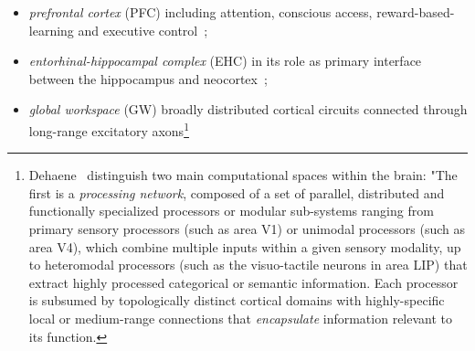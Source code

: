 \begin{itemize}
%
\item {\it{prefrontal cortex}} (PFC) including attention, conscious access, reward-based-learning and executive control~\cite{WangetalNATURE-NEUROSCIENCE-18,KrieteetalPNAS-13};
%
\item {\it{entorhinal-hippocampal complex}} (EHC) in its role as primary interface between the hippocampus and neocortex~\cite{OReillyetalCS-15,OReillySCIENCE-06};
%
\item {\it{global workspace}} (GW) broadly distributed cortical circuits connected through long-range excitatory axons\footnote{%
%
    Dehaene~ distinguish two main computational spaces within the brain: "The first is a {\it{processing network}}, composed of a set of parallel, distributed and functionally specialized processors or modular sub-systems ranging from primary sensory processors (such as area V1) or unimodal processors (such as area V4), which combine multiple inputs within a given sensory modality, up to heteromodal processors (such as the visuo-tactile neurons in area LIP) that extract highly processed categorical or semantic information. Each processor is subsumed by topologically distinct cortical domains with highly-specific local or medium-range connections that {\it{encapsulate}} information relevant to its function.

}
\end{itemize}
